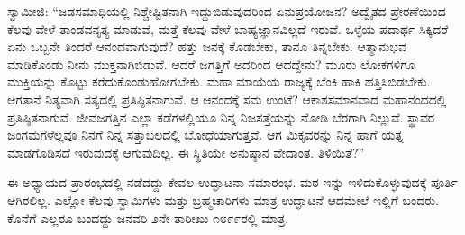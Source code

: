  ಸ್ವಾಮೀಜಿ: “ಜಡಸಮಾಧಿಯಲ್ಲಿ ನಿಶ್ಚೇಷ್ಟಿತನಾಗಿ ಇದ್ದುಬಿಡುವುದರಿಂದ ಏನು\break ಪ್ರಯೋಜನ? ಅದ್ವೈತದ ಪ್ರೇರಣೆಯಿಂದ ಕೆಲವು ವೇಳೆ ತಾಂಡವನೃತ್ಯ ಮಾಡುವೆ, ಮತ್ತೆ ಕೆಲವು ವೇಳೆ ಬಾಹ್ಯಜ್ಞಾನವಿಲ್ಲದೆ ಇರುವೆ. ಒಳ್ಳೆಯ ಪದಾರ್ಥ ಸಿಕ್ಕಿದರೆ ಏನು ಒಬ್ಬನೇ ತಿಂದರೆ ಆನಂದವಾಗುವುದೆ? ಹತ್ತು ಜನಕ್ಕೆ ಕೊಡಬೇಕು, ತಾನೂ ತಿನ್ನಬೇಕು. ಆತ್ಮಾನುಭವ ಮಾಡಿಕೊಂಡು ನೀನು ಮುಕ್ತನಾಗಿಬಿಡುವೆ. ಆದರೆ ಜಗತ್ತಿಗೆ ಅದರಿಂದ ಆದದ್ದೇನು? ಮೂರು ಲೋಕಗಳಿಗೂ ಮುಕ್ತಿಯನ್ನು ಕೊಟ್ಟು ಕರೆದುಕೊಂಡುಹೋಗಬೇಕು. ಮಹಾ ಮಾಯೆಯ ರಾಜ್ಯಕ್ಕೆ ಬೆಂಕಿ ಹಾಕಿ ಹತ್ತಿಸಿಬಿಡಬೇಕು. ಆಗತಾನೆ ನಿತ್ಯವಾಗಿ ಸತ್ಯದಲ್ಲಿ ಪ್ರತಿಷ್ಠಿತನಾಗುವೆ. ಆ ಆನಂದಕ್ಕೆ ಸಮ ಉಂಟೆ? ಆಕಾಶಸಮಾನವಾದ ಮಹಾನಂದದಲ್ಲಿ ಪ್ರತಿಷ್ಠಿತನಾಗುವೆ. ಜೀವಜಗತ್ತಿನ ಎಲ್ಲಾ ಕಡೆಗಳಲ್ಲಿಯೂ ನಿನ್ನ ನಿಜಸತ್ತೆಯನ್ನು ನೋಡಿ ಬೆರಗಾಗಿ ನಿಲ್ಲುವೆ. ಸ್ಥಾವರ ಜಂಗಮಗಳೆಲ್ಲವೂ ನಿನಗೆ ನಿನ್ನ ಸತ್ತಾಬಲದಲ್ಲಿ ಬೋಧೆಯಾಗುತ್ತವೆ. ಆಗ ಮಿಕ್ಕವರನ್ನು ನಿನ್ನ ಹಾಗೆ ಯತ್ನ ಮಾಡಗೊಡಿಸದೆ ಇರುವುದಕ್ಕೆ ಆಗುವುದಿಲ್ಲ. ಈ ಸ್ಥಿತಿಯೇ ಅನುಷ್ಠಾನ ವೇದಾಂತ. ತಿಳಿಯಿತೆ?” 

 ಈ ಅಧ್ಯಾಯದ ಪ್ರಾರಂಭದಲ್ಲಿ ನಡೆದದ್ದು ಕೇವಲ ಉದ್ಘಾಟನಾ ಸಮಾರಂಭ. ಮಠ ಇನ್ನು ಇಳಿದುಕೊಳ್ಳುವುದಕ್ಕೆ ಪೂರ್ತಿ ಆಗಿರಲಿಲ್ಲ. ಎಲ್ಲೋ ಕೆಲವು ಸ್ವಾಮಿಗಳು ಮತ್ತು ಬ್ರಹ್ಮಚಾರಿಗಳು ಮಾತ್ರ ಉದ್ಘಾಟನೆ ಆದಮೇಲೆ ಇಲ್ಲಿಗೆ ಬಂದರು. ಕೊನೆಗೆ ಎಲ್ಲರೂ ಬಂದದ್ದು ಜನವರಿ ೨ನೇ ತಾರೀಖು ೧೮೯೯ರಲ್ಲಿ ಮಾತ್ರ. 

